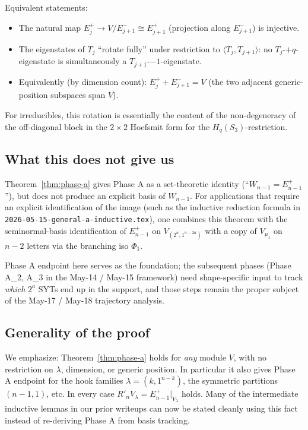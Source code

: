\documentclass[11pt]{article}
\theoremstyle{definition}
\begin{document}
Equivalent statements:
\begin{itemize}[leftmargin=2em,topsep=0.3em,itemsep=0.2em]
\item The natural map $E_j^+ \to V / E_{j+1}^- \cong E_{j+1}^+$
(projection along $E_{j+1}^-$) is injective.
\item The eigenstates of $T_j$ ``rotate fully'' under restriction
to $\langle T_j, T_{j+1}\rangle$: no $T_j$-$+q$-eigenstate is
simultaneously a $T_{j+1}$-$-1$-eigenstate.
\item Equivalently (by dimension count): $E_j^+ + E_{j+1}^- = V$
(the two adjacent generic-position subspaces span $V$).
\end{itemize}
For irreducibles, this rotation is essentially the content of the
non-degeneracy of the off-diagonal block in the $2 \times 2$
Hoefsmit form for the $H_q(S_3)$-restriction.

\subsection{What this does not give us}

Theorem~\ref{thm:phase-a} gives Phase A as a set-theoretic identity
(``$W_{n-1} = E_{n-1}^+$''), but does not produce an explicit basis
of $W_{n-1}$.  For applications that require an explicit
identification of the image (such as the inductive reduction
formula in \texttt{2026-05-15-general-a-inductive.tex}), one
combines this theorem with the seminormal-basis identification of
$E_{n-1}^+$ on $V_{(2^a, 1^{n-2a})}$ with a copy of $V_{\mu_1}$ on
$n - 2$ letters via the branching iso $\Phi_1$.

Phase A endpoint here serves as the foundation; the subsequent
phases (Phase A_2, A_3 in the May-14 / May-15 framework) need
shape-specific input to track \emph{which} $2^a$ SYTs end up in
the support, and those steps remain the proper subject of the
May-17 / May-18 trajectory analysis.

\subsection{Generality of the proof}

We emphasize: Theorem~\ref{thm:phase-a} holds for \emph{any} module
$V$, with no restriction on $\lambda$, dimension, or generic
position.  In particular it also gives Phase A endpoint for the
hook families $\lambda = (k, 1^{n-k})$, the symmetric partitions
$(n-1, 1)$, etc.  In every case
$R'_n V_\lambda = E_{n-1}^+|_{V_\lambda}$ holds.  Many of the
intermediate inductive lemmas in our prior writeups can now be
stated cleanly using this fact instead of re-deriving Phase A from
basis tracking.
\end{document}
